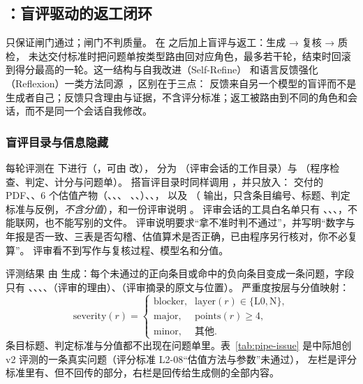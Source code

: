 \subsection{：盲评驱动的返工闭环}
\label{sec:pipe-refine}

 只保证闸门通过；闸门不判质量。 在  之后加上盲评与返工：生成 → 复核 → 质检，
未达交付标准时把问题单按类型路由回对应角色，最多若干轮，结束时回滚到得分最高的一轮。这一结构与自我改进（Self-Refine）
和语言反馈强化（Reflexion）一类方法同源~\citep{madaan2023selfrefine,shinn2023reflexion}，区别在于三点：
反馈来自另一个模型的盲评而不是生成者自己；反馈只含理由与证据，不含评分标准；返工被路由到不同的角色和会话，而不是同一个会话自我修改。

\subsubsection{盲评目录与信息隐藏}

每轮评测在  下进行（，可由  改），
分为 （评审会话的工作目录）与 （程序检查、判定、计分与问题单）。
 搭盲评目录时同样调用 ，并只放入：
交付的 PDF、、6 个估值产物（、、、
、、）、、，
以及 （ 输出，只含条目编号、标题、判定标准与反例，\emph{不含分值}），和一份评审说明 。
评审会话的工具白名单只有 、、、，不能联网，也不能写别的文件。
评审说明要求“拿不准时判不通过”，并写明“数字与年报是否一致、三表是否勾稽、估值算术是否正确，已由程序另行核对，你不必复算”。
评审看不到写作与复核过程、模型名和分值。

评测结果  由  生成：每个未通过的正向条目或命中的负向条目变成一条问题，字段只有
、、、、（评审的理由）、（评审摘录的原文与位置）。
严重度按层与分值映射：
\begin{equation}
  \mathrm{severity}(r)=\begin{cases}
    \text{blocker}, & \mathrm{layer}(r)\in\{\mathrm{L0},\mathrm{N}\},\\
    \text{major}, & \mathrm{points}(r)\ge 4,\\
    \text{minor}, & \text{其他}.
  \end{cases}
\end{equation}
条目标题、判定标准与分值都不出现在问题单里。表~\ref{tab:pipe-issue} 是中际旭创 v2 评测的一条真实问题（评分标准 L2-08“估值方法与参数”未通过），
左栏是评分标准里有、但不回传的部分，右栏是回传给生成侧的全部内容。

